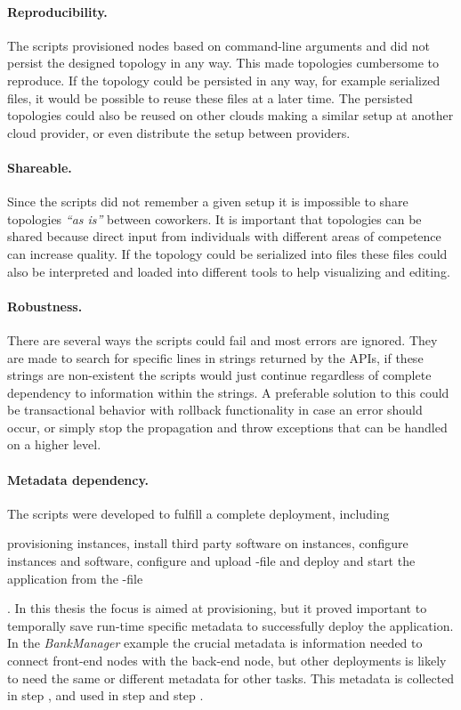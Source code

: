 \paragraph{Reproducibility.}

The scripts provisioned nodes based on command-line arguments
and did not persist the designed topology in any way.
This made topologies cumbersome to reproduce.
If the topology could be persisted in any way, for example serialized files,
it would be possible to reuse these files at a later time.
The persisted topologies could also be reused on other clouds making a 
similar setup at another cloud provider, or even distribute the setup
between providers.

\paragraph{Shareable.}

Since the scripts did not remember a given setup it is impossible 
to share topologies \emph{``as is''} between coworkers.
It is important that topologies can be shared because direct input from individuals
with different areas of competence can increase quality.
If the topology could be serialized into files these files could also be interpreted
and loaded into different tools to help visualizing and editing.

\paragraph{Robustness.}

There are several ways the scripts could fail and most errors are ignored.
They are made to search for specific lines in strings returned by the APIs,
if these strings are non-existent the scripts would just continue regardless
of complete dependency to information within the strings.
A preferable solution to this could be transactional behavior with rollback functionality
in case an error should occur, or simply stop the propagation
and throw exceptions that can be handled on a higher level.

\paragraph{Metadata dependency.}

The scripts were developed to fulfill a complete deployment,
including 
\begin{ii}
  \iitem provisioning instances, 
  \iitem install third party software on instances,
  \iitem configure instances and software,
  \iitem configure and upload -file and
  \iitem deploy and start the application from the -file
\end{ii}.
In this thesis the focus is aimed at provisioning, but it proved important to temporally 
save run-time specific metadata to successfully deploy the application.
In the \emph{BankManager} example the crucial metadata is information needed to connect 
front-end nodes with the back-end node, but other deployments is likely to need the same 
or different metadata for other tasks.
This metadata is collected in step , and used in step  and step .

